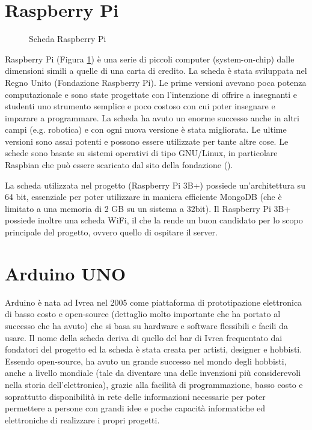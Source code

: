 \documentclass[12pt]{report}
\begin{document}
%
\section{Raspberry Pi}
%

\begin{figure}[H]
	\caption{Scheda Raspberry Pi}
	\label{fig:raspi}
\end{figure}

Raspberry Pi (Figura \ref{fig:raspi}) è una serie di piccoli computer (system-on-chip) dalle dimensioni simili a quelle di una carta di credito. La scheda è stata sviluppata nel Regno Unito (Fondazione Raspberry Pi). Le prime versioni avevano poca potenza computazionale e sono state progettate con l'intenzione di offrire a insegnanti e studenti uno strumento semplice e poco costoso con cui poter insegnare e imparare a programmare. La scheda ha avuto un enorme successo anche in altri campi (e.g$.$ robotica) e con ogni nuova versione è stata migliorata. Le ultime versioni sono assai potenti e possono essere utilizzate per tante altre cose. Le schede sono basate su sistemi operativi di tipo GNU/Linux, in particolare Raspbian che può essere scaricato dal sito della fondazione (\cite{raspbian}). 

La scheda utilizzata nel progetto (Raspberry Pi 3B+) possiede un'architettura su 64 bit, essenziale per poter utilizzare in maniera efficiente MongoDB (che è limitato a una memoria di 2 GB su un sistema a 32bit). 
Il Raspberry Pi 3B+ possiede inoltre una scheda WiFi, il che la rende un buon candidato per lo scopo principale del progetto, ovvero quello di ospitare il server.


%
\section{Arduino UNO}
%

Arduino\cite{arduino_storia} è nata ad Ivrea nel 2005 come piattaforma di prototipazione elettronica di basso costo e open-source (dettaglio molto importante che ha portato al successo che ha avuto) che si basa su hardware e software flessibili e facili da usare. Il nome della scheda deriva di quello del bar di Ivrea frequentato dai fondatori del progetto ed la scheda è stata creata per artisti, designer e hobbisti. Essendo open-source, ha avuto un grande successo nel mondo degli hobbisti, anche a livello mondiale (tale da diventare una delle invenzioni più considerevoli nella storia dell'elettronica), grazie alla facilità di programmazione, basso costo e soprattutto disponibilità in rete delle informazioni necessarie per poter permettere a persone con grandi idee e poche capacità informatiche ed elettroniche di realizzare i propri progetti. 
\end{document}
